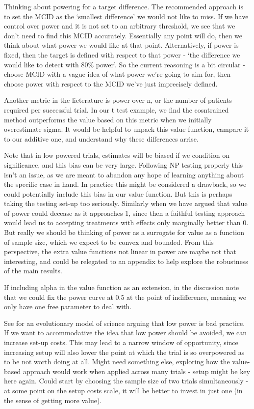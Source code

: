 \documentclass[sagev, Crown]{sagej}
\begin{document}
Thinking about powering for a target difference. The recommended approach is to set the MCID as the `smallest difference' we would not like to miss. If we have control over power and it is not set to an arbitrary threshold, we see that we don't need to find this MCID accurately. Essentially any point will do, then we think about what power we would like at that point. Alternatively, if power is fixed, then the target is defined with respect to that power - `the difference we would like to detect with 80\% power'. So the current reasoning is a bit circular - choose MCID with a vague idea of what power we're going to aim for, then choose power with respect to the MCID we've just imprecisely defined.

Another metric in the lieterature is power over n, or the number of patients required per successful trial. In our t test example, we find the cosntrained method outperforms the value based on this metric when we initially overestimate sigma. It would be helpful to unpack this value function, campare it to our additive one, and understand why these differences arrise.

Note that in low powered trials, estimates will be biased if we condition on significance, and this bias can be very large. Following NP testing properly this isn't an issue, as we are meant to abandon any hope of learning anything about the specific case in hand. In practice this might be considered a drawback, so we could potentially include this bias in our value function. But this is perhaps taking the testing set-up too seriously. Similarly when we have argued that value of power could decease as it approaches 1, since then a faithful testing approach would lead us to accepting treatments with effects only marginally better than 0. But really we should be thinking of power as a surrogate for value as a function of sample size, which we expect to be convex and bounded. From this perspective, the extra value functions not linear in power are maybe not that interesting, and could be relegated to an appendix to help explore the robustness of the main results.

If including alpha in the value function as an extension, in the discussion note that we could fix the power curve at 0.5 at the point of indifference, meaning we only have one free parameter to deal with.

See \cite{Smaldino2016} for an evolutionary model of science arguing that low power is bad practice. If we want to accommodative the idea that low power should be avoided, we can increase set-up costs. This may lead to a narrow window of opportunity, since increasing setup will also lower the point at which the trial is so overpowered as to be not worth doing at all. Might need something else, exploring how the value-based approach would work when applied across many trials - setup might be key here again. Could start by choosing the sample size of two trials simultaneously - at some point on the setup costs scale, it will be better to invest in just one (in the sense of getting more value).
\end{document}
